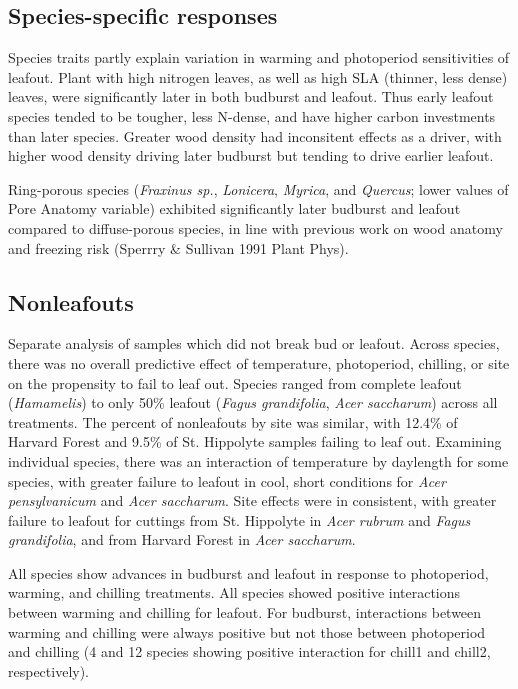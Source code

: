 \documentclass{article}
\begin{document}
\subsection*{Species-specific responses}

Species traits partly explain variation in warming and photoperiod sensitivities of leafout. 
Plant with high nitrogen leaves, as well as high SLA (thinner, less dense) leaves, were significantly later in both budburst and leafout. Thus early leafout species tended to be tougher, less N-dense, and have higher carbon investments than later species. Greater wood density had inconsitent effects as a driver, with higher wood density driving later budburst but tending to drive earlier leafout.

Ring-porous species (\emph{Fraxinus sp.}, \emph{Lonicera}, \emph{Myrica}, and \emph{Quercus}; lower values of Pore Anatomy variable) exhibited significantly later budburst and leafout compared to diffuse-porous species, in line with previous work on wood anatomy and freezing risk (Sperrry \& Sullivan 1991 Plant Phys).

\subsection*{Nonleafouts}

Separate analysis of samples which did not break bud or leafout. Across species, there was no overall predictive effect of temperature, photoperiod, chilling, or site on the propensity to fail to leaf out. 
Species ranged from complete leafout (\emph{Hamamelis}) to only 50\% leafout (\emph{Fagus grandifolia}, \emph{Acer saccharum}) across all treatments. The percent of nonleafouts by site was similar, with 12.4\% of Harvard Forest and 9.5\% of St. Hippolyte samples failing to leaf out. Examining individual species,  there was an interaction of temperature by daylength for some species, with greater failure to leafout in cool, short conditions for \emph{Acer pensylvanicum}  and \emph{Acer saccharum}. Site effects were in consistent, with greater failure to leafout for cuttings from St. Hippolyte in \emph{Acer rubrum} and \emph{Fagus grandifolia}, and from Harvard Forest in \emph{Acer saccharum}.

All species show advances in budburst and leafout in response to photoperiod, warming, and chilling treatments. All species showed positive interactions between warming and chilling for leafout. For budburst, interactions between warming and chilling were always positive but not those between photoperiod and chilling (4 and 12 species showing positive interaction for chill1 and chill2, respectively).
\end{document}
